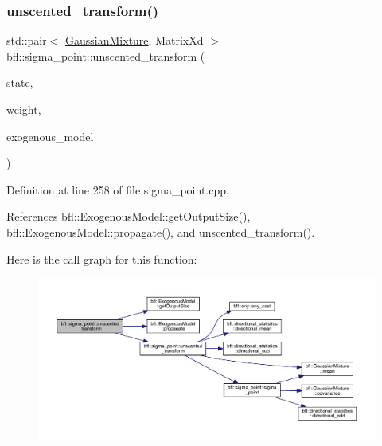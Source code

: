 \subsubsection{\texorpdfstring{unscented\+\_\+transform()}{unscented\_transform()}\hspace{0.1cm}{\footnotesize\ttfamily [6/8]}}
{\footnotesize\ttfamily std\+::pair$<$ \mbox{\hyperlink{classbfl_1_1GaussianMixture}{Gaussian\+Mixture}}, Matrix\+Xd $>$ bfl\+::sigma\+\_\+point\+::unscented\+\_\+transform (\begin{DoxyParamCaption}\item[{const \mbox{\hyperlink{classbfl_1_1GaussianMixture}{Gaussian\+Mixture}} \&}]{state,  }\item[{const \mbox{\hyperlink{structbfl_1_1sigma__point_1_1UTWeight}{U\+T\+Weight}} \&}]{weight,  }\item[{\mbox{\hyperlink{classbfl_1_1ExogenousModel}{Exogenous\+Model}} \&}]{exogenous\+\_\+model }\end{DoxyParamCaption})}



Definition at line 258 of file sigma\+\_\+point.\+cpp.



References bfl\+::\+Exogenous\+Model\+::get\+Output\+Size(), bfl\+::\+Exogenous\+Model\+::propagate(), and unscented\+\_\+transform().

Here is the call graph for this function\+:
\nopagebreak
\begin{figure}[H]
\begin{center}
\leavevmode
\includegraphics[width=350pt]{namespacebfl_1_1sigma__point_ad1df67122c8b838ae669d1f2e0665481_cgraph}
\end{center}
\end{figure}
\mbox{\label{namespacebfl_1_1sigma__point_a5b51d83e121121ecc6d65e9e5e7d6859}} 
